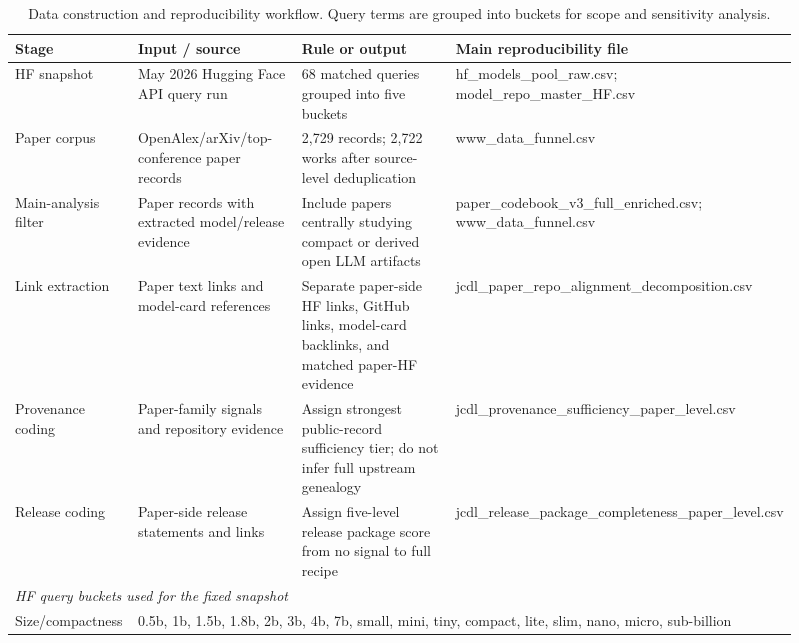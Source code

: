 \begin{table}[t]
\centering
\caption{Data construction and reproducibility workflow. Query terms are grouped into buckets for scope and sensitivity analysis.}
\label{tab:reproducibility-workflow}
\small
\begin{tabular}{p{0.16\linewidth}p{0.24\linewidth}p{0.31\linewidth}p{0.20\linewidth}}
\toprule
Stage & Input / source & Rule or output & Main reproducibility file \\
\midrule
HF snapshot & May 2026 Hugging Face API query run & 68 matched queries grouped into five buckets & hf\_\allowbreak{}models\_\allowbreak{}pool\_\allowbreak{}raw.csv;\allowbreak{} model\_\allowbreak{}repo\_\allowbreak{}master\_\allowbreak{}HF.csv \\
Paper corpus & OpenAlex/arXiv/top-conference paper records & 2,729 records; 2,722 works after source-level deduplication & www\_\allowbreak{}data\_\allowbreak{}funnel.csv \\
Main-analysis filter & Paper records with extracted model/release evidence & Include papers centrally studying compact or derived open LLM artifacts & paper\_\allowbreak{}codebook\_\allowbreak{}v3\_\allowbreak{}full\_\allowbreak{}enriched.csv;\allowbreak{} www\_\allowbreak{}data\_\allowbreak{}funnel.csv \\
Link extraction & Paper text links and model-card references & Separate paper-side HF links, GitHub links, model-card backlinks, and matched paper-HF evidence & jcdl\_\allowbreak{}paper\_\allowbreak{}repo\_\allowbreak{}alignment\_\allowbreak{}decomposition.csv \\
Provenance coding & Paper-family signals and repository evidence & Assign strongest public-record sufficiency tier; do not infer full upstream genealogy & jcdl\_\allowbreak{}provenance\_\allowbreak{}sufficiency\_\allowbreak{}paper\_\allowbreak{}level.csv \\
Release coding & Paper-side release statements and links & Assign five-level release package score from no signal to full recipe & jcdl\_\allowbreak{}release\_\allowbreak{}package\_\allowbreak{}completeness\_\allowbreak{}paper\_\allowbreak{}level.csv \\
\midrule
\multicolumn{4}{l}{\textit{HF query buckets used for the fixed snapshot}} \\
\multicolumn{1}{p{0.16\linewidth}}{Size/compactness} & \multicolumn{3}{p{0.78\linewidth}}{0.5b, 1b, 1.5b, 1.8b, 2b, 3b, 4b, 7b, small, mini, tiny, compact, lite, slim, nano, micro, sub-billion} \\

\end{tabular}
\end{table}
